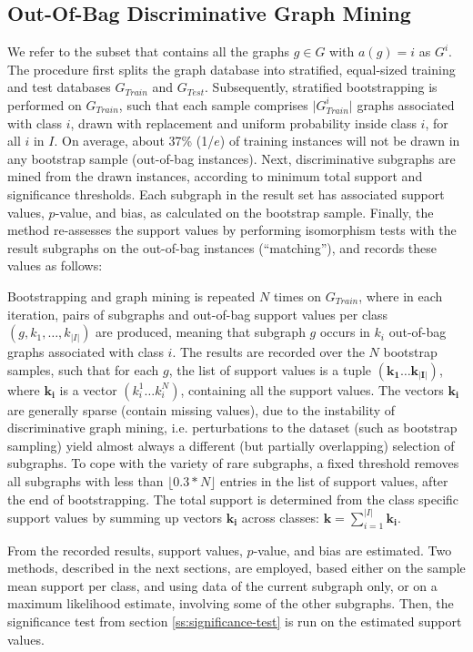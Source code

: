 \documentclass{sig-alternate}
\begin{document}
\subsection{Out-Of-Bag Discriminative Graph Mining}
\label{ss:oob-dgm}
We refer to the subset that contains all the graphs $g \in G$
with $a(g)=i$ as $G^i$.  The procedure first splits the graph database 
into stratified, equal-sized training and test databases $G_{Train}$ and $G_{Test}$.
Subsequently, stratified bootstrapping is performed on $G_{Train}$, such
that each sample comprises $\vert G_{Train}^i\vert$ graphs associated with
class $i$, drawn with replacement and uniform probability inside 
class $i$, for all $i$ in $I$.  On average, about 37\% (1/$e$) of training instances 
will not be drawn in any bootstrap sample (out-of-bag instances). 
Next, discriminative subgraphs are mined from the drawn instances,
according to minimum total support and significance thresholds. 
Each subgraph in the result set has associated support values, $p$-value, 
and bias, as calculated on the bootstrap sample.
Finally, the method re-assesses the support values by performing isomorphism
tests with the result subgraphs on the out-of-bag instances (``matching''), and records these values as follows:

Bootstrapping and graph mining is repeated $N$ times on $G_{Train}$, where in each
iteration, pairs of subgraphs and out-of-bag support values per class
$(g,k_1,\ldots,k_{\vert I\vert})$ are produced, meaning that subgraph $g$
occurs in $k_i$ out-of-bag graphs associated with class $i$. The results are
recorded over the $N$ bootstrap samples, such that for each $g$, the list of
support values is a tuple $(\mathbf{k_1}\ldots\mathbf{k_{\vert I\vert}})$,
where $\mathbf{k_i}$ is a vector $(k_i^1\ldots k_i^N)$, containing all the
support values.  
The vectors $\mathbf{k_i}$
are generally sparse (contain missing values), due to the instability of discriminative graph mining,
i.e. perturbations to the dataset (such as bootstrap sampling) yield almost
always a different (but partially overlapping) selection of subgraphs. To cope with the
variety of rare subgraphs, a fixed threshold removes all subgraphs with less
than $\lfloor0.3*N\rfloor$ entries in the list of support values, after the end
of bootstrapping.
The total support is determined from the class specific support values by
summing up vectors $\mathbf{k_i}$ across classes:
$\mathbf{k}=\sum_{i=1}^{\vert I\vert} \mathbf{k_i}$. 

From the recorded results, support values, $p$-value, 
and bias are estimated. Two methods, described in the next sections, are employed, based either
on the sample mean support per class, and using data of the current subgraph
only, or on a maximum likelihood estimate, involving some of the other
subgraphs. Then, the significance test from section \ref{ss:significance-test}
is run on the estimated support values. 
\end{document}
